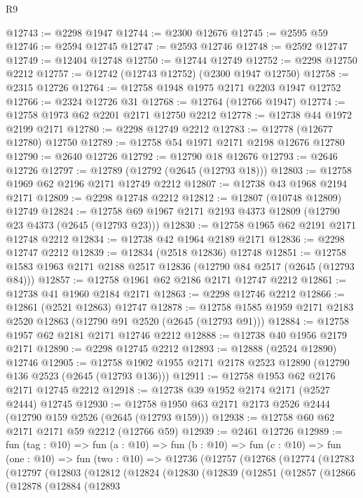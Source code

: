 \begin{lexlean}{R9}
\begin{coremodule}
@12743 := @2298 @1947
@12744 := @2300 @12676
@12745 := @2595 @59
@12746 := @2594 @12745
@12747 := @2593 @12746
@12748 := @2592 @12747
@12749 := @12404 @12748
@12750 := @12744 @12749
@12752 := @2298 @12750 @2212
@12757 := @12742 (@12743 @12752) (@2300 @1947 @12750)
@12758 := @2315 @12726
@12764 := @12758 @1948 @1975 @2171 @2203 @1947 @12752
@12766 := @2324 @12726 @31
@12768 := @12764 (@12766 @1947)
@12774 := @12758 @1973 @62 @2201 @2171 @12750 @2212
@12778 := @12738 @44 @1972 @2199 @2171
@12780 := @2298 @12749 @2212
@12783 := @12778 (@12677 @12780) @12750
@12789 := @12758 @54 @1971 @2171 @2198 @12676 @12780
@12790 := @2640 @12726
@12792 := @12790 @18 @12676
@12793 := @2646 @12726
@12797 := @12789 (@12792 (@2645 (@12793 @18)))
@12803 := @12758 @1969 @62 @2196 @2171 @12749 @2212
@12807 := @12738 @43 @1968 @2194 @2171
@12809 := @2298 @12748 @2212
@12812 := @12807 (@10748 @12809) @12749
@12824 := @12758 @69 @1967 @2171 @2193 @4373 @12809 (@12790 @23 @4373 (@2645 (@12793 @23)))
@12830 := @12758 @1965 @62 @2191 @2171 @12748 @2212
@12834 := @12738 @42 @1964 @2189 @2171
@12836 := @2298 @12747 @2212
@12839 := @12834 (@2518 @12836) @12748
@12851 := @12758 @1583 @1963 @2171 @2188 @2517 @12836 (@12790 @84 @2517 (@2645 (@12793 @84)))
@12857 := @12758 @1961 @62 @2186 @2171 @12747 @2212
@12861 := @12738 @41 @1960 @2184 @2171
@12863 := @2298 @12746 @2212
@12866 := @12861 (@2521 @12863) @12747
@12878 := @12758 @1585 @1959 @2171 @2183 @2520 @12863 (@12790 @91 @2520 (@2645 (@12793 @91)))
@12884 := @12758 @1957 @62 @2181 @2171 @12746 @2212
@12888 := @12738 @40 @1956 @2179 @2171
@12890 := @2298 @12745 @2212
@12893 := @12888 (@2524 @12890) @12746
@12905 := @12758 @1902 @1955 @2171 @2178 @2523 @12890 (@12790 @136 @2523 (@2645 (@12793 @136)))
@12911 := @12758 @1953 @62 @2176 @2171 @12745 @2212
@12918 := @12738 @39 @1952 @2174 @2171 (@2527 @2444) @12745
@12930 := @12758 @1950 @63 @2171 @2173 @2526 @2444 (@12790 @159 @2526 (@2645 (@12793 @159)))
@12938 := @12758 @60 @62 @2171 @2171 @59 @2212 (@12766 @59)
@12939 := @2461 @12726
@12989 := fun (tag : @10) =>
  fun (a : @10) =>
  fun (b : @10) =>
  fun (c : @10) =>
  fun (one : @10) =>
  fun (two : @10) =>
  @12736
    (@12757
      (@12768
        (@12774
          (@12783
            (@12797
              (@12803
                (@12812
                  (@12824
                    (@12830
                      (@12839
                        (@12851
                          (@12857
                            (@12866
                              (@12878
                                (@12884
                                  (@12893

\end{coremodule}
\end{lexlean}
